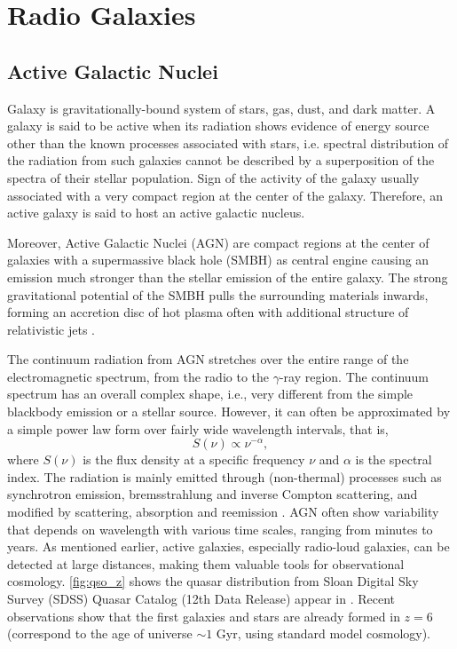 \chapter{Radio Galaxies}

\section{Active Galactic Nuclei}
Galaxy is gravitationally-bound system of stars, gas, dust, and dark matter. A galaxy is said to be active when its radiation shows evidence of energy source other than the known processes associated with stars, i.e. spectral distribution of the radiation from such galaxies cannot be described by a superposition of
the spectra of their stellar population. Sign of the activity of the galaxy usually associated with a very compact region at the center of the galaxy. Therefore, an active galaxy is said to host an active galactic nucleus.

Moreover, Active Galactic Nuclei (AGN) are compact regions at the center of galaxies  with a supermassive black hole (SMBH) as central engine causing an emission much stronger than the stellar emission of the entire galaxy. The strong gravitational potential of the SMBH pulls the surrounding materials inwards, forming an accretion disc of hot plasma often with additional structure of relativistic jets \citep{netzer2013}.

The continuum radiation from AGN stretches over the entire range of the electromagnetic spectrum, from the radio to the $\gamma$-ray region. The continuum spectrum has an overall complex shape, i.e., very different from the simple blackbody emission or a stellar source. However, it can often be approximated by a simple power law form over fairly wide wavelength intervals, that is,
\begin{equation}
\label{eq:fluxdensity}
S(\nu) \varpropto \nu^{-\alpha},
\end{equation}
where $S(\nu)$ is the flux density at a specific frequency $\nu$ and $\alpha$ is the spectral index. The radiation is mainly emitted through (non-thermal) processes such as synchrotron emission, bremsstrahlung and inverse Compton scattering, and modified by scattering, absorption and reemission \citep{kembhavi1999}. AGN often show variability that depends on wavelength with various time scales, ranging from minutes to years.  As mentioned earlier, active galaxies, especially radio-loud galaxies, can be detected at large distances, making them valuable tools for observational cosmology. \autoref{fig:qso_z} shows the quasar distribution from Sloan Digital Sky Survey (SDSS) Quasar Catalog (12th Data Release) appear in \cite{paris2017}. Recent observations show that the first galaxies and stars are already formed in $z = 6$ (correspond to the age of universe $\sim 1$ Gyr, using standard model cosmology).

